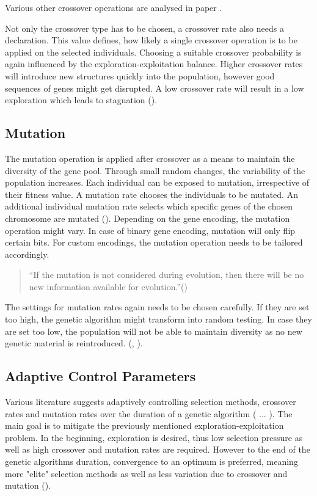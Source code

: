 Various other crossover operations are analysed in paper . 

Not only the crossover type has to be chosen, a crossover rate also needs a declaration. This value defines, how likely a single crossover operation is to be applied on the selected individuals.
Choosing a suitable crossover probability is again influenced by the exploration-exploitation balance. Higher crossover rates will introduce new structures quickly into the population, however good sequences of genes might get disrupted. A low crossover rate will result in a low exploration which leads to stagnation (\cite{grefenstette_optimization_1986}).

\subsection{Mutation}
The mutation operation is applied after crossover as a means to maintain the diversity of the gene pool. Through small random changes, the variability of the population increases. Each individual can be exposed to mutation, irrespective of their fitness value.
A mutation rate chooses the individuals to be mutated. An additional individual mutation rate selects which specific genes of the chosen chromosome are mutated (\cite{srinivas_genetic_1994}). Depending on the gene encoding, the mutation operation might vary. In case of binary gene encoding, mutation will only flip certain bits. For custom encodings, the mutation operation needs to be tailored accordingly.

\begin{quote}
	\begin{em}
		\enquote{If the mutation is not considered during evolution, then there will be no new information available for evolution.}(\cite{katoch_review_2021})
	\end{em}
\end{quote}

The settings for mutation rates again needs to be chosen carefully. If they are set too high, the genetic algorithm might transform into random testing. In case they are set too low, the population will not be able to maintain diversity as no new genetic material is reintroduced. (\cite{klampfl_using_nodate}, \cite{grefenstette_optimization_1986}).

\subsection{Adaptive Control Parameters}
Various literature suggests adaptively controlling selection methods, crossover rates and mutation rates over the duration of a genetic algorithm ( ... ). The main goal is to mitigate the previously mentioned exploration-exploitation problem. In the beginning, exploration is desired, thus low selection pressure as well as high crossover and mutation rates are required. However to the end of the genetic algorithms duration, convergence to an optimum is preferred, meaning more "elite" selection methods as well as less variation due to crossover and mutation (\cite{srinivas_genetic_1994}).

